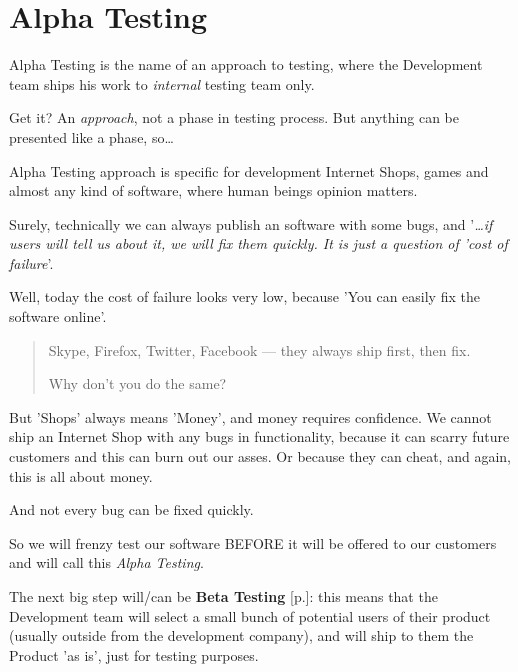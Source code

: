 \section{Alpha Testing}
\label{sec:Alpha Testing}

Alpha Testing is the name of an approach to testing, where the Development team ships his work to \emph{internal} testing team only.

Get it? An \emph{approach}, not a phase in testing process. But anything can be presented like a phase, so\ldots

Alpha Testing approach is specific for development Internet Shops, games and almost any kind of software, where human beings opinion matters.

Surely, technically we can always publish an software with some bugs, and '\textit{…if users will tell us about it, we will fix them quickly. It is just a question of 'cost of failure}'. 

Well, today the cost of failure looks very low, because 'You can easily fix the software online'.

\begin{quote}
Skype, Firefox, Twitter, Facebook — they always ship first, then fix.

Why don't you do the same?
\end{quote}

But 'Shops' always means 'Money', and money requires confidence. We cannot ship an Internet Shop with any bugs in functionality, because it can scarry future customers and this can burn out our asses. Or because they can cheat, and again, this is all about money.

And not every bug can be fixed quickly.

So we will frenzy test our software BEFORE it will be offered to our customers and will call this \emph{Alpha Testing}.

The next big step will/can be \textbf{Beta Testing} [p.\pageref{sec:Beta Testing}]: this means that the Development team will select a small bunch of potential users of their product (usually outside from the development company), and will ship to them the Product 'as is', just for testing purposes.

